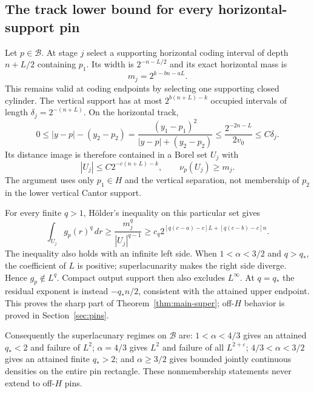 \subsection{The track lower bound for every horizontal-support pin}
Let $p\in\mathcal B$. At stage $j$ select a supporting horizontal
coding interval of depth $n+L/2$ containing $p_1$. Its width is
$2^{-n-L/2}$ and its exact horizontal mass is
\begin{equation}\label{eq:track-mass}
 m_j=2^{k-bn-aL}.
\end{equation}
This remains valid at coding endpoints by selecting one supporting closed
cylinder. The vertical support has at most $2^{b(n+L)-k}$ occupied
intervals of length $\delta_j=2^{-(n+L)}$. On the horizontal track,
\[
 0\leq|y-p|-(y_2-p_2)
 =\frac{(y_1-p_1)^2}{|y-p|+(y_2-p_2)}
 \leq\frac{2^{-2n-L}}{2v_0}\leq C\delta_j.
\]
Its distance image is therefore contained in a Borel set $U_j$ with
\begin{equation}\label{eq:track-image}
 |U_j|\leq C2^{-c(n+L)-k},\qquad \nu_p(U_j)\geq m_j.
\end{equation}
The argument uses only $p_1\in H$ and the vertical separation, not
membership of $p_2$ in the lower vertical Cantor support.

For every finite $q>1$, H\"older's inequality on this particular set gives
\begin{equation}\label{eq:track-lower}
 \int_{U_j}g_p(r)^q\,dr
 \geq\frac{m_j^q}{|U_j|^{q-1}}
 \geq c_q 2^{[q(c-a)-c]L+[q(c-b)-c]n}.
\end{equation}
The inequality also holds with an infinite left side.
When $1<\alpha<3/2$ and $q>q_*$, the coefficient of $L$ is positive;
superlacunarity makes the right side diverge. Hence $g_p\notin L^q$.
Compact output support then also excludes $L^\infty$.
At $q=q_*$ the residual exponent is instead $-q_*n/2$, consistent with
the attained upper endpoint. This proves the sharp part of
Theorem~\ref{thm:main-super}; off-$H$ behavior is proved in
Section~\ref{sec:pins}.

Consequently the superlacunary regimes on $\mathcal B$ are:
$1<\alpha<4/3$ gives an attained $q_*<2$ and failure of $L^2$;
$\alpha=4/3$ gives $L^2$ and failure of all $L^{2+\varepsilon}$;
$4/3<\alpha<3/2$ gives an attained finite $q_*>2$; and
$\alpha\geq3/2$ gives bounded jointly continuous densities on the entire
pin rectangle. These nonmembership statements never extend to off-$H$ pins.
